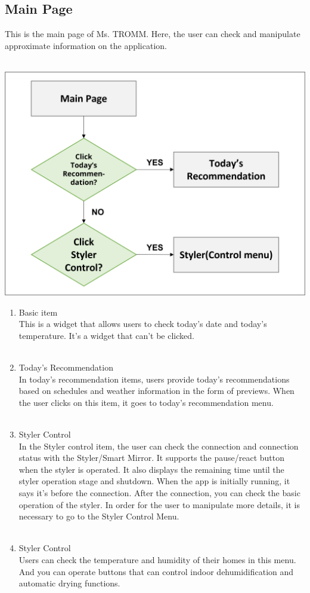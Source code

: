 \documentclass[conference]{IEEEtran}
\begin{document}
\break

\subsection{Main Page}
This is the main page of Ms. TROMM. Here, the user can check and manipulate approximate information on the application. \\ \\
\centerline{\includegraphics[scale=0.5]{assets/flow_3.png}}
\begin{enumerate}
    \item Basic item\\
        This is a widget that allows users to check today's date and today's temperature. It's a widget that can't be clicked.  \\ \\
    \item Today's Recommendation\\
        In today's recommendation items, users provide today's recommendations based on schedules and weather information in the form of previews. When the user clicks on this item, it goes to today's recommendation menu.\\ \\
    \item Styler Control\\
        In the Styler control item, the user can check the connection and connection status with the Styler/Smart Mirror.  It supports the pause/react button when the styler is operated. It also displays the remaining time until the styler operation stage and shutdown. When the app is initially running, it says it's before the connection. After the connection, you can check the basic operation of the styler. In order for the user to manipulate more details, it is necessary to go to the Styler Control Menu. \\ \\
    \item Styler Control\\
        Users can check the temperature and humidity of their homes in this menu. And you can operate buttons that can control indoor dehumidification and automatic drying functions. \\ \\
\end{enumerate}
\end{document}
